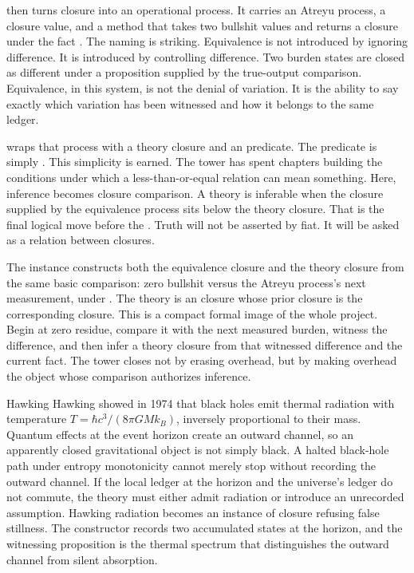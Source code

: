  then turns closure into an operational process. It
carries an Atreyu process, a closure value, and a method  that
takes two bullshit values and returns a  closure under the
fact . The naming is striking. Equivalence is not introduced
by ignoring difference. It is introduced by controlling difference. Two
burden states are closed as different under a proposition supplied by the
true-output comparison. Equivalence, in this system, is not the denial of
variation. It is the ability to say exactly which variation has been witnessed
and how it belongs to the same ledger.

 wraps that process with a theory closure and an
 predicate. The predicate is simply . This
simplicity is earned. The tower has spent chapters building the conditions
under which a less-than-or-equal relation can mean something. Here, inference
becomes closure comparison. A theory is inferable when the closure supplied by
the equivalence process sits below the theory closure. That is the final
logical move before the . Truth will not be asserted by fiat. It
will be asked as a relation between closures.

The instance  constructs both the equivalence closure and
the theory closure from the same basic comparison: zero bullshit versus the
Atreyu process's next measurement, under . The theory is
an  closure whose prior closure is the corresponding
 closure. This is a compact formal image of the whole project.
Begin at zero residue, compare it with the next measured burden, witness the
difference, and then infer a theory closure from that witnessed difference and
the current fact. The tower closes not by erasing overhead, but by making
overhead the object whose comparison authorizes inference.

\begin{gphenom}{Hawking}
\label{ph:hawking}
\GPhObs Hawking showed in 1974 that black holes emit thermal radiation with
temperature $T=\hbar c^3/(8\pi G M k_B)$, inversely proportional to their
mass. Quantum effects at the event horizon create an outward channel, so an
apparently closed gravitational object is not simply black.
\GPhCon A halted black-hole path under entropy monotonicity cannot merely stop
without recording the outward channel. If the local ledger at the horizon and
the universe's ledger do not commute, the theory must either admit radiation
or introduce an unrecorded assumption.
\GPhSeq Hawking radiation becomes an instance of closure refusing false
stillness. The constructor  records two accumulated
states at the horizon, and the witnessing proposition is the thermal spectrum
that distinguishes the outward channel from silent absorption.
\end{gphenom}

